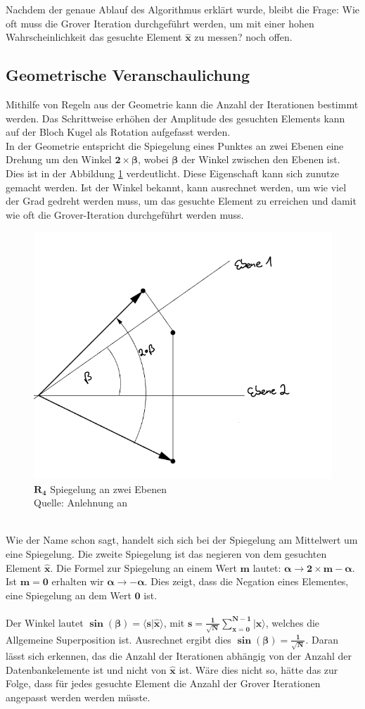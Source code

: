 Nachdem der genaue Ablauf des Algorithmus erklärt wurde, bleibt die Frage: Wie oft muss die Grover Iteration durchgeführt werden, um mit einer hohen Wahrscheinlichkeit das gesuchte Element $\mathbf{\hat{x}}$ zu messen? noch offen.

\subsection{Geometrische Veranschaulichung}
Mithilfe von Regeln aus der Geometrie kann die Anzahl der Iterationen bestimmt werden. Das Schrittweise erhöhen der Amplitude des gesuchten Elements kann auf der Bloch Kugel als Rotation aufgefasst werden. 
\\
In der Geometrie entspricht die Spiegelung eines Punktes an zwei Ebenen eine Drehung um den Winkel $\mathbf{2 \times \beta}$, wobei $\mathbf{\beta}$ der Winkel zwischen den Ebenen ist. Dies ist in der Abbildung \ref{fig:zweiEbenen} verdeutlicht. Diese Eigenschaft kann sich zunutze gemacht werden. Ist der Winkel bekannt, kann ausrechnet werden, um wie viel der Grad gedreht werden muss, um das gesuchte Element zu erreichen und damit wie oft die Grover-Iteration durchgeführt werden muss.
 \begin{figure}[hbtp]
	\centering
	\includegraphics[width=.6\textwidth]{figures/zweiEbenen.png}
	\caption{$\mathbf{R_4}$ Spiegelung an zwei Ebenen \\ Quelle: Anlehnung an \cite[S. 149]{Ho17}}
	\label{fig:zweiEbenen}
\end{figure} 
\noindent
\\
Wie der Name schon sagt, handelt sich sich bei der Spiegelung am Mittelwert um eine Spiegelung. Die zweite Spiegelung ist das negieren von dem gesuchten Element $\mathbf{\hat{x}}$. Die Formel zur Spiegelung an einem Wert $\mathbf{m}$ lautet: $\mathbf{\alpha \rightarrow 2 \times m - \alpha}$. Ist $\mathbf{m=0}$ erhalten wir $\mathbf{\alpha \rightarrow - \alpha}$. Dies zeigt, dass die Negation eines Elementes, eine Spiegelung an dem Wert $\mathbf{0}$ ist.
\\ 
\\
Der Winkel lautet $\mathbf{\sin(\beta) = \langle s | \hat{x} \rangle}$, mit $\mathbf{s = \frac{1}{\sqrt{N}}\sum\limits_{x=0}^{N-1}|x\rangle}$, welches die Allgemeine Superposition ist. Ausrechnet ergibt dies $\mathbf{\sin(\beta) = \frac{1}{\sqrt N}}$. Daran lässt sich erkennen, das die Anzahl der Iterationen abhängig von der Anzahl der Datenbankelemente ist und nicht von $\mathbf{\hat{x}}$ ist. Wäre dies nicht so, hätte das zur Folge, dass für jedes gesuchte Element die Anzahl der Grover Iterationen angepasst werden werden müsste.
